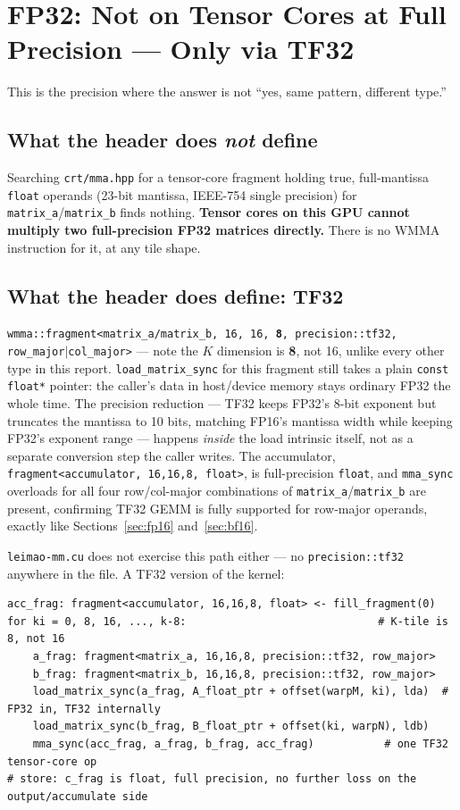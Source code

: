 \documentclass[11pt]{article}
\begin{document}
\section{FP32: Not on Tensor Cores at Full Precision --- Only via TF32}
\label{sec:fp32}

This is the precision where the answer is not ``yes, same pattern, different type.''

\subsection{What the header does \emph{not} define}
Searching \texttt{crt/mma.hpp} for a tensor-core fragment holding true, full-mantissa
\texttt{float} operands (23-bit mantissa, IEEE-754 single precision) for
\texttt{matrix\_a}/\texttt{matrix\_b} finds nothing. \textbf{Tensor cores on this GPU
cannot multiply two full-precision FP32 matrices directly.} There is no WMMA
instruction for it, at any tile shape.

\subsection{What the header does define: TF32}
\texttt{wmma::fragment<matrix\_a/matrix\_b, 16, 16, \textbf{8}, precision::tf32,
row\_major$|$col\_major>} --- note the $K$ dimension is \textbf{8}, not 16, unlike every
other type in this report. \texttt{load\_matrix\_sync} for this fragment still takes a
plain \texttt{const float*} pointer: the caller's data in host/device memory stays
ordinary FP32 the whole time. The precision reduction --- TF32 keeps FP32's 8-bit
exponent but truncates the mantissa to 10 bits, matching FP16's mantissa width while
keeping FP32's exponent range --- happens \emph{inside} the load intrinsic itself, not as
a separate conversion step the caller writes. The accumulator,
\texttt{fragment<accumulator, 16,16,8, float>}, is full-precision \texttt{float}, and
\texttt{mma\_sync} overloads for all four row/col-major combinations of
\texttt{matrix\_a}/\texttt{matrix\_b} are present, confirming TF32 GEMM is fully
supported for row-major operands, exactly like Sections~\ref{sec:fp16}
and~\ref{sec:bf16}.

\texttt{leimao-mm.cu} does not exercise this path either --- no \texttt{precision::tf32}
anywhere in the file. A TF32 version of the kernel:
\begin{lstlisting}
acc_frag: fragment<accumulator, 16,16,8, float> <- fill_fragment(0)
for ki = 0, 8, 16, ..., k-8:                              # K-tile is 8, not 16
    a_frag: fragment<matrix_a, 16,16,8, precision::tf32, row_major>
    b_frag: fragment<matrix_b, 16,16,8, precision::tf32, row_major>
    load_matrix_sync(a_frag, A_float_ptr + offset(warpM, ki), lda)  # FP32 in, TF32 internally
    load_matrix_sync(b_frag, B_float_ptr + offset(ki, warpN), ldb)
    mma_sync(acc_frag, a_frag, b_frag, acc_frag)           # one TF32 tensor-core op
# store: c_frag is float, full precision, no further loss on the output/accumulate side
\end{lstlisting}
\end{document}
